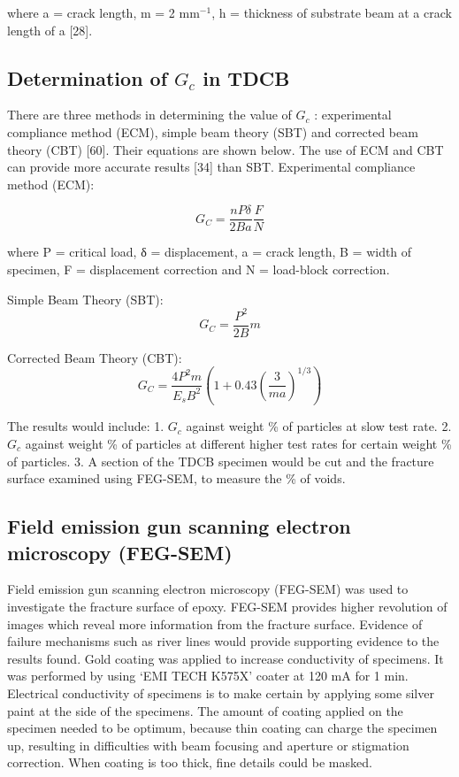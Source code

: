 \documentclass[numbers=noendperiod,chapterprefix=on]{icldt} %
\begin{document}
where a = crack length, m = 2 mm$^{-1}$, h = thickness of substrate beam at a crack length of a [28].

\subsection{Determination of $G_c$ in TDCB}
There are three methods in determining the value of $G_c$ : experimental compliance method (ECM), simple beam theory (SBT) and corrected beam theory (CBT) [60]. Their equations are shown below. The use of ECM and CBT can provide more accurate results [34] than SBT.
Experimental compliance method (ECM):

\begin{equation} 
G_C=\frac{nPδ}{2Ba}\frac{F}{N} 
\end{equation}

where P = critical load, δ = displacement, a = crack length, B = width of specimen, F = displacement correction and N = load-block correction.

Simple Beam Theory (SBT):
\begin{equation} 
G_C=\frac{P^2}{2B}m
\end{equation}

Corrected Beam Theory (CBT):
\begin{equation} 
G_C=\frac{4P^2 m}{E_s B^2}\left( 1+0.43\left( \frac{3}{ma}\right) ^{1/3} \right) 
\end{equation}

The results would include:
1.	$G_c$ against weight \% of particles at slow test rate. 
2.	$G_c$ against weight \% of particles at different higher test rates for certain weight \% of particles. 
3.	A section of the TDCB specimen would be cut and the fracture surface examined using FEG-SEM, to measure the \% of voids. 

\subsection{Field emission gun scanning electron microscopy (FEG-SEM)}
Field emission gun scanning electron microscopy (FEG-SEM) was used to investigate the fracture surface of epoxy. FEG-SEM provides higher revolution of images which reveal more information from the fracture surface. Evidence of failure mechanisms such as river lines would provide supporting evidence to the results found. 
Gold coating was applied to increase conductivity of specimens. It was performed by using ‘EMI TECH K575X’ coater at 120 mA for 1 min. Electrical conductivity of specimens is to make certain by applying some silver paint at the side of the specimens.
The amount of coating applied on the specimen needed to be optimum, because thin coating can charge the specimen up, resulting in difficulties with beam focusing and aperture or stigmation correction. When coating is too thick, fine details could be masked.
\end{document}
